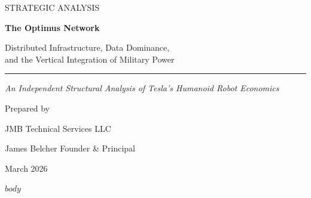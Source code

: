 \documentclass[10pt,a4paper]{article}
\begin{document}
\begin{titlepage}
\pagecolor{bgdark}
\begin{center}
\vspace*{2cm}

{\small\color{tableborder}\MakeUppercase{Strategic Analysis}\par}

\vspace{1.5cm}

{\fontsize{36}{42}\selectfont\bfseries\color{textheading}
The Optimus Network\par}

\vspace{0.8cm}

{\Large\color{textlight}
Distributed Infrastructure, Data Dominance,\\[4pt]
and the Vertical Integration of Military Power\par}

\vspace{1.5cm}

{\color{ruleline}\rule{0.4\textwidth}{0.4pt}\par}

\vspace{1.5cm}

{\normalsize\color{textlight}\itshape
An Independent Structural Analysis of Tesla's Humanoid Robot Economics\par}

\vspace{2cm}

{\normalsize\color{tableborder}
Prepared by\par}
\vspace{0.3cm}
{\large\color{textaccent}
JMB Technical Services LLC\par}
\vspace{0.2cm}
{\normalsize\color{textlight}
James Belcher \textbar{} Founder \& Principal\par}

\vspace{2cm}

{\normalsize\color{tableborder}
March 2026\par}

\vfill

\end{center}
\end{titlepage}

$body$
\end{document}
